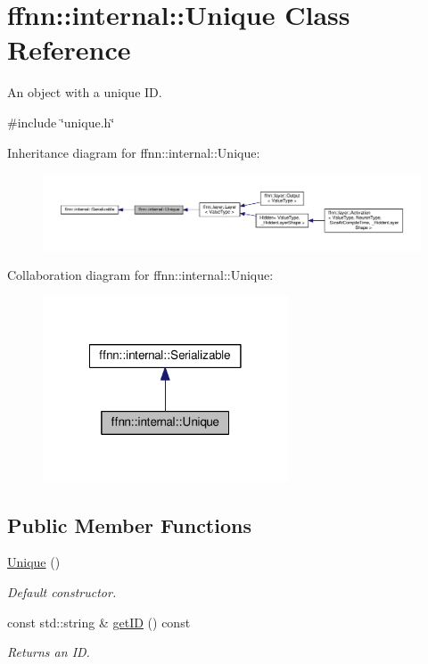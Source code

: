 \hypertarget{classffnn_1_1internal_1_1_unique}{\section{ffnn\-:\-:internal\-:\-:Unique Class Reference}
\label{classffnn_1_1internal_1_1_unique}
}


An object with a unique I\-D.  




{\ttfamily \#include \char`\"{}unique.\-h\char`\"{}}



Inheritance diagram for ffnn\-:\-:internal\-:\-:Unique\-:
\nopagebreak
\begin{figure}[H]
\begin{center}
\leavevmode
\includegraphics[width=350pt]{classffnn_1_1internal_1_1_unique__inherit__graph}
\end{center}
\end{figure}


Collaboration diagram for ffnn\-:\-:internal\-:\-:Unique\-:\nopagebreak
\begin{figure}[H]
\begin{center}
\leavevmode
\includegraphics[width=206pt]{classffnn_1_1internal_1_1_unique__coll__graph}
\end{center}
\end{figure}
\subsection*{Public Member Functions}
\begin{DoxyCompactItemize}
\item 
\hyperlink{classffnn_1_1internal_1_1_unique_ad4f80a296525cc5c6c74571ccab94842}{Unique} ()
\begin{DoxyCompactList}\small\item\em Default constructor. \end{DoxyCompactList}\item 
const std\-::string \& \hyperlink{classffnn_1_1internal_1_1_unique_a5723da9af9ff0ff8043e55239fe10f7f}{get\-I\-D} () const 
\begin{DoxyCompactList}\small\item\em Returns an I\-D. \end{DoxyCompactList}\end{DoxyCompactItemize}
